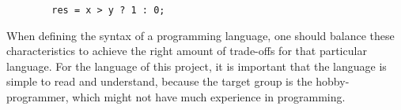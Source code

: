 \begin{code}
	\begin{lstlisting}
		res = x > y ? 1 : 0;
	\end{lstlisting}
\end{code}

When defining the syntax of a programming language, one should balance these characteristics to achieve the right amount of trade-offs for that particular language. For the language of this project, it is important that the language is simple to read and understand, because the target group is the hobby-programmer, which might not have much experience in programming.